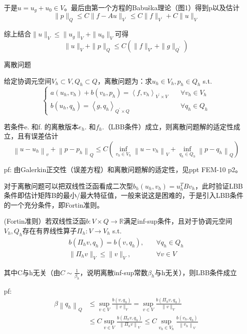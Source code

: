 于是$u = u_g + u_0 \in V$。最后由第一个方程的Babuška理论（图1）得到p以及估计
\[
  \|p\|_Q \le C\|f - Au\|_{V^\prime} \le C\|f\|_{V^\prime} + C\|u\|_V
\]

综上结合$\|u\|_V \le \|u_g\|_V + \|u_0\|_V$可得
\[
  \|u\|_V + \|p\|_Q \le C(\|f\|_{V\prime} + \|g\|_{Q^\prime})
\]

离散问题

给定协调元空间$V_{h} \subset V, Q_{h} \subset Q$，离散问题为：求$u_{h} \in V_{h}, p_{h} \in Q_{h}$ s.t.
\[
  \left\{\begin{array}{ll}
    a\left(u_{h}, v_{h}\right)+b\left(v_{h}, p_{h}\right)=\left\langle f, v_{h}\right\rangle_{V^{\prime} \times V} \quad & \forall v_{h} \in V_{h} \\
    b\left(u_{h}, q_{h}\right)=\left\langle g, q_{h}\right\rangle_{Q^{\prime} \times Q} \quad & \forall q_{h} \in Q_{h}
  \end{array}\right.
\]

若条件e. 和f. 的离散版本$e_h.$ 和$f_h.$（LBB条件）成立，则离散问题解的适定性成立，且有误差估计
\[
  \left\|u-u_{h}\right\|_{v}+\left\|p-p_{h}\right\|_{Q} \leq C\left(\inf _{v_{h} \in V_{h}}\left\|u-v_{h}\right\|_{V}+\inf _{q_{h} \in Q_{h}}\left\|p-q_{h}\right\|_{Q}\right)
\]

pf: 由Galerkin正交性（误差方程）和离散问题解的适定性，见ppt FEM-10 p2。

对于离散问题可以把双线性泛函看成二次型$b_h(u_h, v_h) = u_h^T B v_h$，此时验证LBB条件即估计矩阵B的最小/最大特征值，一般来说这是困难的，于是引入LBB条件的一个充分条件，即Fortin准则。

\begin{thm}
  (Fortin准则）若双线性泛函$b: V \times Q \to \mathbb{R}$满足inf-sup条件，且对于协调元空间$V_h, Q_h$存在有界线性算子$\Pi_h: V \to V_h$ s.t.
  \[
    \begin{aligned}
      b(\Pi_h v, q_h) = b(v, q_h),& \quad \forall q_h \in Q_h\\
      \|\Pi_h v\|_V \le \|v\|_V,& \quad \forall v \in V
    \end{aligned}
  \]

  其中C与h无关（由$C \sim \frac{1}{\beta_h}$，说明离散inf-sup常数$\beta_h$与h无关），则LBB条件成立
\end{thm}

pf:
\[
  \begin{aligned}
    \beta\left\|q_{h}\right\|_{Q} & \leq \sup _{v \in V} \frac{b\left(v, q_{h}\right)}{\|v\|_{V}}=\sup _{v \in V} \frac{b\left(\Pi_{h} v, q_{h}\right)}{\|v\|_{V}} \\
    & \le C \sup _{v \in V} \frac{b\left(\Pi_{h} v, q_{h}\right)}{\left\|\Pi_{h} v\right\|_{V}} \leq C \sup _{v_{h} \in V_{h}} \frac{b\left(v_{h}, q_{h}\right)}{\left\|v_{h}\right\|_{V}}
  \end{aligned}
\]

